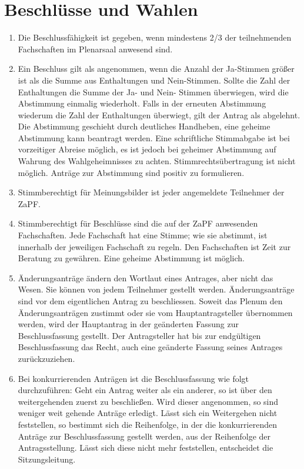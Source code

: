 \section{Beschlüsse und Wahlen}
\begin{enumerate}
\item{Die Beschlussfähigkeit ist gegeben, wenn mindestens 2/3 der teilnehmenden Fachschaften im
Plenarsaal anwesend sind.}

\item{Ein Beschluss gilt als angenommen, wenn die Anzahl der Ja-Stimmen größer ist als die Summe aus
Enthaltungen und Nein-Stimmen. Sollte die Zahl der Enthaltungen die
Summe der Ja- und Nein- Stimmen überwiegen, wird die Abstimmung
einmalig wiederholt. Falls in der erneuten Abstimmung wiederum die
Zahl der Enthaltungen überwiegt, gilt der Antrag als abgelehnt. Die
Abstimmung geschieht durch deutliches Handheben, eine geheime
Abstimmung kann beantragt werden. Eine schriftliche Stimmabgabe ist
bei vorzeitiger Abreise möglich, es ist jedoch bei geheimer
Abstimmung auf Wahrung des Wahlgeheimnisses zu achten.
Stimmrechtsübertragung ist nicht möglich. Anträge zur Abstimmung
sind positiv zu formulieren.}

\item{Stimmberechtigt für Meinungsbilder ist jeder angemeldete Teilnehmer der
ZaPF.}

\item{Stimmberechtigt für Beschlüsse sind die auf der ZaPF anwesenden Fachschaften. Jede Fachschaft hat
eine Stimme; wie sie abstimmt, ist innerhalb der jeweiligen
Fachschaft zu regeln. Den Fachschaften ist Zeit zur Beratung zu
gewähren. Eine geheime Abstimmung ist möglich.}

\item{Änderungsanträge ändern den Wortlaut eines Antrages, aber nicht das Wesen. Sie können von jedem
Teilnehmer gestellt werden. Änderungsanträge sind vor dem eigentlichen Antrag zu beschliessen.
Soweit das Plenum den Änderungsanträgen zustimmt oder sie vom Hauptantragsteller übernommen
werden, wird der Hauptantrag in der geänderten Fassung zur Beschlussfassung gestellt. Der
Antragsteller hat bis zur endgültigen Beschlussfassung das Recht, auch eine geänderte Fassung
seines Antrages zurückzuziehen.}

\item{Bei konkurrierenden Anträgen ist die Beschlussfassung wie folgt durchzuführen:
Geht ein Antrag weiter als ein anderer, so ist über den weitergehenden zuerst zu beschließen. Wird
dieser angenommen, so sind weniger weit gehende Anträge erledigt. Lässt sich ein Weitergehen
nicht feststellen, so bestimmt sich die Reihenfolge, in der die konkurrierenden Anträge zur
Beschlussfassung gestellt werden, aus der Reihenfolge der Antragsstellung. Lässt sich diese nicht
mehr feststellen, entscheidet die Sitzungsleitung.}


\end{enumerate}
